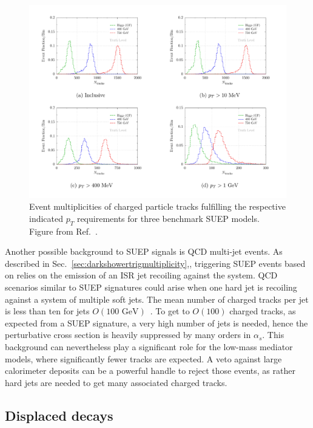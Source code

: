 \begin{figure}[tbp]
  \centering
  \includegraphics[width=\textwidth]{figures/DS_chargedParticleMultiplicities_SUEP.pdf}
  \caption{Event multiplicities of charged particle tracks fulfilling the respective indicated $p_{T}$ requirements for three benchmark SUEP models. Figure from Ref.~\cite{Knapen:2016hky}.}
  \label{fig:SUEPchargedParticleMultiplicities}
\end{figure}

Another possible background to SUEP signals is QCD multi-jet events. As described in Sec.~\ref{sec:darkshowertrigmultiplicity},, triggering SUEP events based on \MET relies on the emission of an ISR jet recoiling against the system. QCD scenarios similar to SUEP signatures could arise when one hard jet is recoiling against a system of multiple soft jets. The mean number of charged tracks per jet is less than ten for jets $O(\text{100~GeV})$~\cite{Aad:2016oit}. To get to $O(100)$ charged tracks, as expected from a SUEP signature, a very high number of jets is needed, hence the perturbative cross section is heavily suppressed by many orders in $\alpha_{s}$. This background can nevertheless play a significant role for the low-mass mediator models, where significantly fewer tracks are expected. A veto against large calorimeter deposits can be a powerful handle to reject those events, as rather hard jets are needed to get many associated charged tracks.

\subsection{Displaced decays} %
\label{sec:darkshowerdisp}

